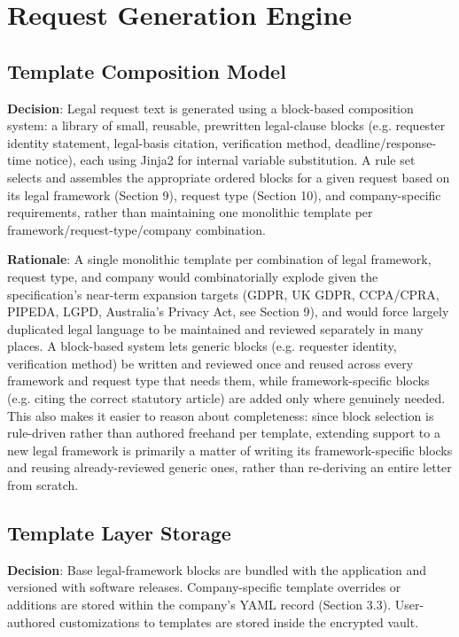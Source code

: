 \chapter{Request Generation Engine}

\section{Template Composition Model}
\textbf{Decision}: Legal request text is generated using a block-based composition system: a library of small, reusable, prewritten legal-clause blocks (e.g. requester identity statement, legal-basis citation, verification method, deadline/response-time notice), each using Jinja2 for internal variable substitution. A rule set selects and assembles the appropriate ordered blocks for a given request based on its legal framework (Section 9), request type (Section 10), and company-specific requirements, rather than maintaining one monolithic template per framework/request-type/company combination.

\textbf{Rationale}: A single monolithic template per combination of legal framework, request type, and company would combinatorially explode given the specification's near-term expansion targets (GDPR, UK GDPR, CCPA/CPRA, PIPEDA, LGPD, Australia's Privacy Act, see Section 9), and would force largely duplicated legal language to be maintained and reviewed separately in many places. A block-based system lets generic blocks (e.g. requester identity, verification method) be written and reviewed once and reused across every framework and request type that needs them, while framework-specific blocks (e.g. citing the correct statutory article) are added only where genuinely needed. This also makes it easier to reason about completeness: since block selection is rule-driven rather than authored freehand per template, extending support to a new legal framework is primarily a matter of writing its framework-specific blocks and reusing already-reviewed generic ones, rather than re-deriving an entire letter from scratch.
\section{Template Layer Storage}
\textbf{Decision}: Base legal-framework blocks are bundled with the application and versioned with software releases. Company-specific template overrides or additions are stored within the company's YAML record (Section 3.3). User-authored customizations to templates are stored inside the encrypted vault.

